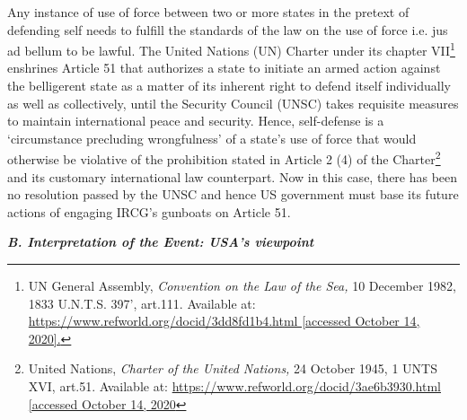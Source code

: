 \begin{multicols}{2}
\noi
Any instance of use of force between two or more states in the pretext of defending self
needs to fulfill the standards of the law on the use of force i.e. jus ad bellum to be lawful.
The United Nations (UN) Charter under its chapter VII\footnote{UN General Assembly, \textit{Convention on the Law of the Sea,} 10 December 1982, 1833 U.N.T.S. 397’, art.111. Available at: \url{https://www.refworld.org/docid/3dd8fd1b4.html [accessed October 14, 2020].}}  enshrines Article 51 that authorizes
a state to initiate an armed action against the belligerent state as a matter of its inherent right
to defend itself individually as well as collectively, until the Security Council (UNSC) takes
requisite measures to maintain international peace and security. Hence, self-defense is a
‘circumstance precluding wrongfulness’ of a state’s use of force that would otherwise be
violative of the prohibition stated in Article 2 (4) of the Charter\footnote{United Nations, \textit{Charter of the United Nations,} 24 October 1945, 1 UNTS XVI, art.51. Available at: \url{https://www.refworld.org/docid/3ae6b3930.html [accessed October 14, 2020}} and its customary
international law counterpart. Now in this case, there has been no resolution passed by the UNSC and hence US government must base its future actions of engaging IRCG’s gunboats
on Article 51.

\vspace{-.1cm}

\noi
\textbf{\textit{B. Interpretation of the Event: USA’s viewpoint}}

\vspace{-.1cm}


\end{multicols}
